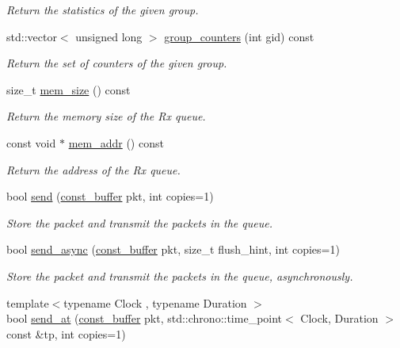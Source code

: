 \begin{DoxyCompactItemize}
\begin{DoxyCompactList}\small\item\em Return the statistics of the given group. \end{DoxyCompactList}\item 
std\+::vector$<$ unsigned long $>$ \hyperlink{classpfq_1_1socket_a5bb4734939ffeb151e199182ec30c4de}{group\+\_\+counters} (int gid) const 
\begin{DoxyCompactList}\small\item\em Return the set of counters of the given group. \end{DoxyCompactList}\item 
size\+\_\+t \hyperlink{classpfq_1_1socket_a1888ae33a42258fdbb2aac1dc3feb55c}{mem\+\_\+size} () const 
\begin{DoxyCompactList}\small\item\em Return the memory size of the Rx queue. \end{DoxyCompactList}\item 
const void $\ast$ \hyperlink{classpfq_1_1socket_a32275b5b77913fadc7671efdef75369b}{mem\+\_\+addr} () const 
\begin{DoxyCompactList}\small\item\em Return the address of the Rx queue. \end{DoxyCompactList}\item 
bool \hyperlink{classpfq_1_1socket_a3c6476cbd81ea906fdbd256c50eba059}{send} (\hyperlink{namespacepfq_ac835a1bd09b4cbaba61c100b50d0a99f}{const\+\_\+buffer} pkt, int copies=1)
\begin{DoxyCompactList}\small\item\em Store the packet and transmit the packets in the queue. \end{DoxyCompactList}\item 
bool \hyperlink{classpfq_1_1socket_a7a1d64344f0c476117d5b7cc2543edad}{send\+\_\+async} (\hyperlink{namespacepfq_ac835a1bd09b4cbaba61c100b50d0a99f}{const\+\_\+buffer} pkt, size\+\_\+t flush\+\_\+hint, int copies=1)
\begin{DoxyCompactList}\small\item\em Store the packet and transmit the packets in the queue, asynchronously. \end{DoxyCompactList}\item 
{\footnotesize template$<$typename Clock , typename Duration $>$ }\\bool \hyperlink{classpfq_1_1socket_a7511ca4657999e1c158859d34cffc831}{send\+\_\+at} (\hyperlink{namespacepfq_ac835a1bd09b4cbaba61c100b50d0a99f}{const\+\_\+buffer} pkt, std\+::chrono\+::time\+\_\+point$<$ Clock, Duration $>$ const \&tp, int copies=1)

\end{DoxyCompactItemize}
